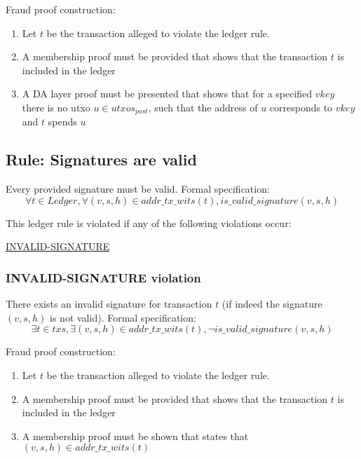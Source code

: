 \documentclass[../midgard.tex]{subfiles}
\begin{document}
Fraud proof construction:
\begin{enumerate}
  \item Let $t$ be the transaction alleged to violate the ledger rule. 
  \item A membership proof must be provided that shows that the transaction $t$ is included in the ledger
  \item A DA layer proof must be presented that shows that for a specified $vkey$ there is no utxo $u \in utxos_{post}$, such that the address of $u$ corresponds to $vkey$ and $t$ spends $u$
\end{enumerate}

\subsection{Rule: Signatures are valid}
\label{rule:signatures-are-valid}
Every provided signature must be valid.
Formal specification:
\begin{equation*}
    \forall t \in Ledger, \forall (v, s, h) \in addr\_tx\_wits(t), is\_valid\_signature(v, s, h)
\end{equation*}
        
This ledger rule is violated if any of the following violations occur:
\begin{itemize-multi}
  \item \hyperref[violation:INVALID-SIGNATURE]{INVALID-SIGNATURE}
\end{itemize-multi}

\subsubsection{INVALID-SIGNATURE violation}
\label{violation:INVALID-SIGNATURE}
There exists an invalid signature for transaction $t$ (if indeed the signature $(v, s, h)$ is not valid).
Formal specification:
\begin{equation*}
    \exists t \in txs, \exists (v, s, h) \in addr\_tx\_wits(t), \lnot is\_valid\_signature(v, s, h)
\end{equation*}

Fraud proof construction:
\begin{enumerate}
  \item Let $t$ be the transaction alleged to violate the ledger rule. 
  \item A membership proof must be provided that shows that the transaction $t$ is included in the ledger
  \item A membership proof must be shown that states that $(v, s, h) \in addr\_tx\_wits(t)$
\end{enumerate}
\end{document}
